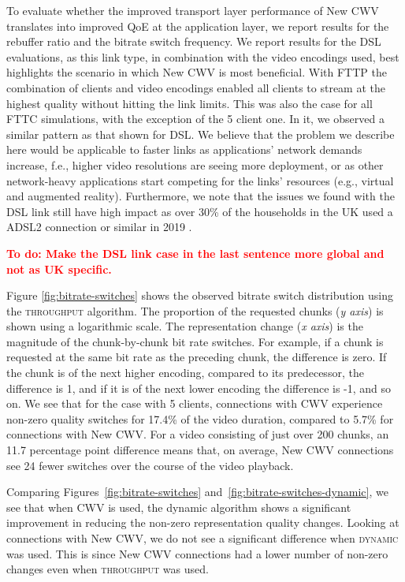 \documentclass[10pt,sigconf]{acmart}
\newcommand{\todo}[1]{\textbf{\textcolor{red}{To do: #1}}}
\begin{document}
To evaluate whether the improved transport layer performance of New CWV translates into improved QoE at the application layer, we report results for the rebuffer ratio and the bitrate switch frequency. We report results for the DSL evaluations, as this link type, in combination with the video encodings used, best highlights the scenario in which New CWV is most beneficial. With FTTP the combination of clients and video encodings enabled all clients to stream at the highest quality without hitting the link limits. This was also the case for all FTTC simulations, with the exception of the 5 client one. In it, we observed a similar pattern as that shown for DSL. We believe that the problem we describe here would be applicable to faster links as applications' network demands increase, f.e., higher video resolutions are seeing more deployment, or as other network-heavy applications start competing for the links' resources (e.g., virtual and augmented reality). Furthermore, we note that the issues we found with the DSL link still have high impact as over 30\% of the households in the UK used a ADSL2 connection or similar in 2019 \cite{ofcom-2020-report}. 

\todo{Make the DSL link case in the last sentence more global and not as UK specific.}

Figure \ref{fig:bitrate-switches} shows the observed bitrate switch distribution using the  \textsc{throughput} algorithm. The proportion of the requested chunks (\emph{y axis}) is shown using a logarithmic scale. The representation change (\emph{x axis}) is the magnitude of the chunk-by-chunk bit rate switches. For example, if a chunk is requested at the same bit rate as the preceding chunk, the difference is zero. If the chunk is of the next higher encoding, compared to its predecessor, the difference is 1, and if it is of the next lower encoding the difference is -1, and so on. We see that for the case with 5 clients, connections with CWV experience non-zero quality switches for 17.4\% of the video duration, compared to 5.7\% for connections with New CWV. For a video consisting of just over 200 chunks, an 11.7 percentage point difference means that, on average, New CWV connections see 24 fewer switches over the course of the video playback.


Comparing Figures~\ref{fig:bitrate-switches} and~\ref{fig:bitrate-switches-dynamic}, we see that when CWV is used, the dynamic algorithm shows a significant improvement in reducing the non-zero representation quality changes. Looking at connections with New CWV, we do not see a significant difference when \textsc{dynamic} was used. This is since New CWV connections had a lower number of non-zero changes even when \textsc{throughput} was used.
\end{document}
